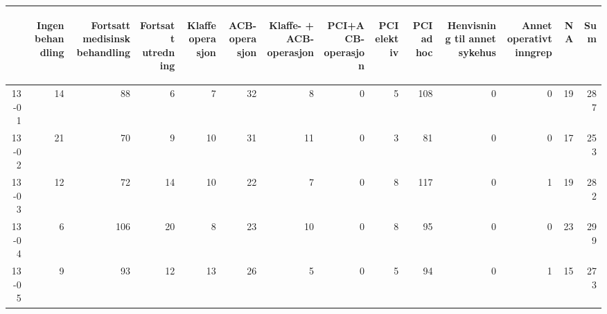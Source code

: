 \documentclass[presentation,xcolor=pdftex,dvipsnames,table]{beamer}
\begin{document}
\begin{frame}
\begin{tiny}
\begin{table}[ht]
\centering
\begin{tabular}{rrrrrrrrrrrrrr}
  \toprule
 & \begin{sideways} Ingen behandling \end{sideways} & \begin{sideways} Fortsatt medisinsk behandling \end{sideways} & \begin{sideways} Fortsatt utredning \end{sideways} & \begin{sideways} Klaffeoperasjon \end{sideways} & \begin{sideways} ACB-operasjon \end{sideways} & \begin{sideways} Klaffe- + ACB-operasjon \end{sideways} & \begin{sideways} PCI+ACB-operasjon \end{sideways} & \begin{sideways} PCI elektiv \end{sideways} & \begin{sideways} PCI ad hoc \end{sideways} & \begin{sideways} Henvisning til annet sykehus \end{sideways} & \begin{sideways} Annet operativt inngrep \end{sideways} & \begin{sideways} NA \end{sideways} & \begin{sideways} Sum \end{sideways} \\ 
  \midrule
13-01 & 14 & 88 & 6 & 7 & 32 & 8 & 0 & 5 & 108 & 0 & 0 & 19 & 287 \\ 
  13-02 & 21 & 70 & 9 & 10 & 31 & 11 & 0 & 3 & 81 & 0 & 0 & 17 & 253 \\ 
  13-03 & 12 & 72 & 14 & 10 & 22 & 7 & 0 & 8 & 117 & 0 & 1 & 19 & 282 \\ 
  13-04 & 6 & 106 & 20 & 8 & 23 & 10 & 0 & 8 & 95 & 0 & 0 & 23 & 299 \\ 
  13-05 & 9 & 93 & 12 & 13 & 26 & 5 & 0 & 5 & 94 & 0 & 1 & 15 & 273 \\ 

\end{tabular}
\end{table}
\end{tiny}
\end{frame}
\end{document}
